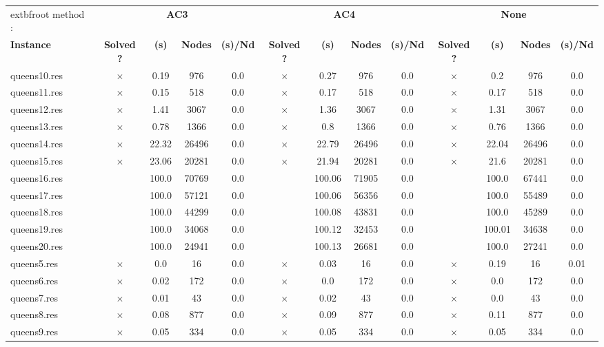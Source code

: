 \documentclass[main.tex]{subfiles}
\begin{document}
\thispagestyle{empty}

\begin{landscape}
\begin{center}
\renewcommand{\arraystretch}{1.4} 
\begin{tabular}{lcccccccccccc}
	\hline
	extbf{root method :} & \multicolumn{4}{c}{\textbf{AC3}} & \multicolumn{4}{c}{\textbf{AC4}} & \multicolumn{4}{c}{\textbf{None}}\\
\textbf{Instance}  & \textbf{Solved ?} & \textbf{(s)} & \textbf{Nodes} & \textbf{(s)/Nd} & \textbf{Solved ?} & \textbf{(s)} & \textbf{Nodes} & \textbf{(s)/Nd} & \textbf{Solved ?} & \textbf{(s)} & \textbf{Nodes} & \textbf{(s)/Nd}\\\hline

queens10.res & $\times$ & 0.19 & 976 & 0.0
 & $\times$ & 0.27 & 976 & 0.0
 & $\times$ & 0.2 & 976 & 0.0
\\
queens11.res & $\times$ & 0.15 & 518 & 0.0
 & $\times$ & 0.17 & 518 & 0.0
 & $\times$ & 0.17 & 518 & 0.0
\\
queens12.res & $\times$ & 1.41 & 3067 & 0.0
 & $\times$ & 1.36 & 3067 & 0.0
 & $\times$ & 1.31 & 3067 & 0.0
\\
queens13.res & $\times$ & 0.78 & 1366 & 0.0
 & $\times$ & 0.8 & 1366 & 0.0
 & $\times$ & 0.76 & 1366 & 0.0
\\
queens14.res & $\times$ & 22.32 & 26496 & 0.0
 & $\times$ & 22.79 & 26496 & 0.0
 & $\times$ & 22.04 & 26496 & 0.0
\\
queens15.res & $\times$ & 23.06 & 20281 & 0.0
 & $\times$ & 21.94 & 20281 & 0.0
 & $\times$ & 21.6 & 20281 & 0.0
\\
queens16.res &  & 100.0 & 70769 & 0.0
 &  & 100.06 & 71905 & 0.0
 &  & 100.0 & 67441 & 0.0
\\
queens17.res &  & 100.0 & 57121 & 0.0
 &  & 100.06 & 56356 & 0.0
 &  & 100.0 & 55489 & 0.0
\\
queens18.res &  & 100.0 & 44299 & 0.0
 &  & 100.08 & 43831 & 0.0
 &  & 100.0 & 45289 & 0.0
\\
queens19.res &  & 100.0 & 34068 & 0.0
 &  & 100.12 & 32453 & 0.0
 &  & 100.01 & 34638 & 0.0
\\
queens20.res &  & 100.0 & 24941 & 0.0
 &  & 100.13 & 26681 & 0.0
 &  & 100.0 & 27241 & 0.0
\\
queens5.res & $\times$ & 0.0 & 16 & 0.0
 & $\times$ & 0.03 & 16 & 0.0
 & $\times$ & 0.19 & 16 & 0.01
\\
queens6.res & $\times$ & 0.02 & 172 & 0.0
 & $\times$ & 0.0 & 172 & 0.0
 & $\times$ & 0.0 & 172 & 0.0
\\
queens7.res & $\times$ & 0.01 & 43 & 0.0
 & $\times$ & 0.02 & 43 & 0.0
 & $\times$ & 0.0 & 43 & 0.0
\\
queens8.res & $\times$ & 0.08 & 877 & 0.0
 & $\times$ & 0.09 & 877 & 0.0
 & $\times$ & 0.11 & 877 & 0.0
\\
queens9.res & $\times$ & 0.05 & 334 & 0.0
 & $\times$ & 0.05 & 334 & 0.0
 & $\times$ & 0.05 & 334 & 0.0
\\
\hline\end{tabular}
\end{center}
\end{landscape}
\end{document}
